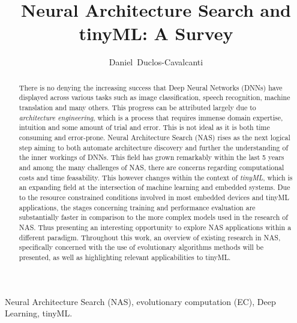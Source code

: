 \documentclass[10pt,        %
               a4paper,     %
               journal,     %
               ]{IEEEtran}
\makeatletter
\def\markboth#1#2{\def\leftmark{\@IEEEcompsoconly{\sffamily}\MakeUppercase{\protect#1}}%
\def\rightmark{\@IEEEcompsoconly{\sffamily}\MakeUppercase{\protect#2}}}
\makeatother
\begin{document}
\title{Neural Architecture Search and tinyML: A Survey}
\author{Daniel~Duclos-Cavalcanti}

\markboth{Seminar for VLSI Entwurfsverfahren, Summer Term 2022}%
{Daniel Duclos-Cavalcanti: Network Architecture Search (NAS)}

\maketitle


\begin{abstract}
There is no denying the increasing success that Deep Neural Networks (DNNs)
have displayed across various tasks such as image classification, speech recognition, machine translation
and many others. This progress can be attributed largely due to \textit{architecture engineering},
which is a process that requires immense domain expertise, intuition and some amount of trial
and error. This is not ideal as it is both time consuming and error-prone. Neural Architecture Search (NAS)
rises as the next logical step aiming to both automate architecture discovery and further the understanding
of the inner workings of DNNs. This field has grown remarkably within the last 5 years and among the many challenges
of NAS, there are concerns regarding computational costs and time feasability. This however changes within the context
of \textit{tinyML}, which is an expanding field at the intersection of machine learning and embedded systems.
Due to the resource constrained conditions involved in most embedded devices and tinyML
applications, the stages concerning training and performance evaluation are substantially faster in comparison to
the more complex models used in the research of NAS. Thus presenting an interesting opportunity to explore NAS applications
within a different paradigm. Throughout this work, an overview of existing research in NAS, specifically concerned
with the use of evolutionary algorithms methods will be presented, as well as highlighting relevant applicabilities to tinyML.

\end{abstract}

\begin{IEEEkeywords}
Neural Architecture Search (NAS), evolutionary computation (EC), Deep Learning, tinyML.
\end{IEEEkeywords}
\end{document}
